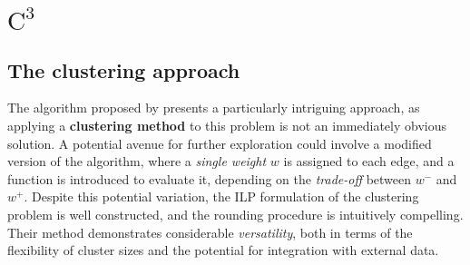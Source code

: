 \section{$\mathrm{C}^3$}

\subsection{The clustering approach}

The algorithm proposed by \textcite{c3} presents a particularly intriguing approach, as applying a \textbf{clustering method} to this problem is not an immediately obvious solution. A potential avenue for further exploration could involve a modified version of the algorithm, where a \textit{single weight} $w$ is assigned to each edge, and a function is introduced to evaluate it, depending on the \textit{trade-off} between $w^-$ and $w^+$. Despite this potential variation, the ILP formulation of the clustering problem is well constructed, and the rounding procedure is intuitively compelling. Their method demonstrates considerable \textit{versatility}, both in terms of the flexibility of cluster sizes and the potential for integration with external data.

\cleardoublepage
